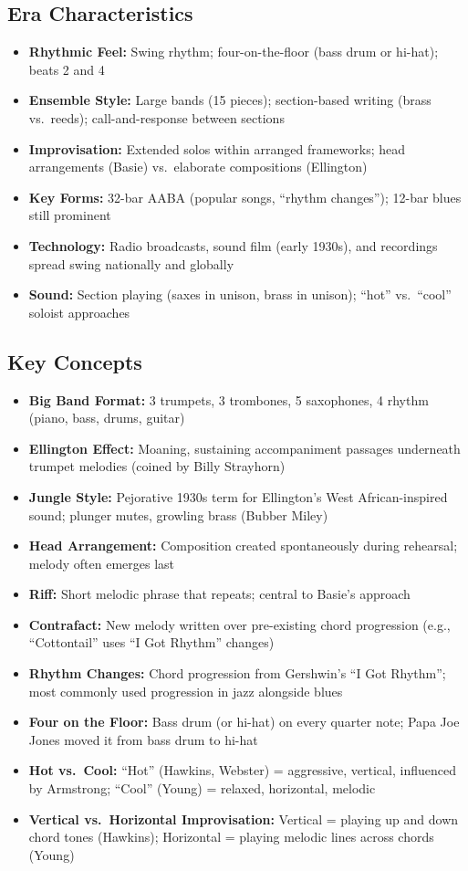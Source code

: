 \documentclass[11pt, letterpaper]{article}
\begin{document}
\subsection{Era Characteristics}
\begin{itemize}
    \item \textbf{Rhythmic Feel:} Swing rhythm; four-on-the-floor (bass drum or hi-hat); beats 2 and 4
    \item \textbf{Ensemble Style:} Large bands (15 pieces); section-based writing (brass vs.\ reeds); call-and-response between sections
    \item \textbf{Improvisation:} Extended solos within arranged frameworks; head arrangements (Basie) vs.\ elaborate compositions (Ellington)
    \item \textbf{Key Forms:} 32-bar AABA (popular songs, ``rhythm changes''); 12-bar blues still prominent
    \item \textbf{Technology:} Radio broadcasts, sound film (early 1930s), and recordings spread swing nationally and globally
    \item \textbf{Sound:} Section playing (saxes in unison, brass in unison); ``hot'' vs.\ ``cool'' soloist approaches
\end{itemize}

\subsection{Key Concepts}
\begin{itemize}
    \item \textbf{Big Band Format:} 3 trumpets, 3 trombones, 5 saxophones, 4 rhythm (piano, bass, drums, guitar)
    \item \textbf{Ellington Effect:} Moaning, sustaining accompaniment passages underneath trumpet melodies (coined by Billy Strayhorn)
    \item \textbf{Jungle Style:} Pejorative 1930s term for Ellington's West African-inspired sound; plunger mutes, growling brass (Bubber Miley)
    \item \textbf{Head Arrangement:} Composition created spontaneously during rehearsal; melody often emerges last
    \item \textbf{Riff:} Short melodic phrase that repeats; central to Basie's approach
    \item \textbf{Contrafact:} New melody written over pre-existing chord progression (e.g., ``Cottontail'' uses ``I Got Rhythm'' changes)
    \item \textbf{Rhythm Changes:} Chord progression from Gershwin's ``I Got Rhythm''; most commonly used progression in jazz alongside blues
    \item \textbf{Four on the Floor:} Bass drum (or hi-hat) on every quarter note; Papa Joe Jones moved it from bass drum to hi-hat
    \item \textbf{Hot vs.\ Cool:} ``Hot'' (Hawkins, Webster) = aggressive, vertical, influenced by Armstrong; ``Cool'' (Young) = relaxed, horizontal, melodic
    \item \textbf{Vertical vs.\ Horizontal Improvisation:} Vertical = playing up and down chord tones (Hawkins); Horizontal = playing melodic lines across chords (Young)
\end{itemize}
\end{document}
